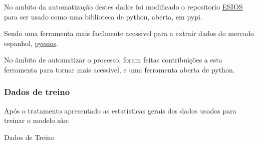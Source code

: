 No ambito da automatização destes dados foi modificado o repositorio \href{https://github.com/SanPen/\gls{ESIOS}}{\gls{ESIOS}} para ser usado como uma biblioteca de python, aberta, em pypi.\par
Sendo uma ferramenta mais facilmente acessivel para a extrair dados do mercado espanhol, \href{https://pypi.org/project/pyesios/}{pyesios}.\par
No âmbito de automatizar o processo, foram feitas contribuições a esta ferramenta para tornar mais acessível, e uma ferramenta aberta de python.\par


\thispagestyle{plain}
 \label{se:dadoscrus}



\thispagestyle{plain}
 \label{se:tratamentodados}

\subsubsection{Dados de treino}

Após o tratamento apresentado as estatísticas gerais dos dados usados para treinar o modelo são:

\begin{table}[H]
    \caption{Dados de Treino}    
    \resizebox{\linewidth}{!}{}
    \end{table}


\thispagestyle{plain}
 \label{se:val_data}

